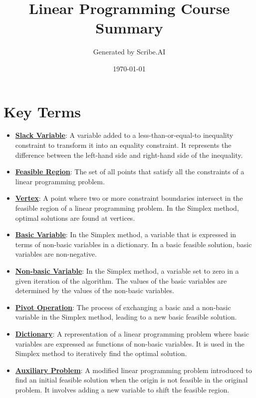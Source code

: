 \documentclass{article}%
\title{Linear Programming Course Summary}%
\author{Generated by Scribe.AI}%
\date{\today}%
\begin{document}
%
\normalsize%
\maketitle%
\section{Key Terms}%
\label{sec:KeyTerms}%
\begin{itemize}[leftmargin=*]%
\item \href{https://www.math.purdue.edu/~yipn/421/2024-08-27-ExSimplex.pdf#page=1}{\textbf{Slack Variable}}: A variable added to a less-than-or-equal-to inequality constraint to transform it into an equality constraint. It represents the difference between the left-hand side and right-hand side of the inequality.%
\item \href{https://www.math.purdue.edu/~yipn/421/2024-08-27-ExSimplex.pdf#page=4}{\textbf{Feasible Region}}: The set of all points that satisfy all the constraints of a linear programming problem.%
\item \href{https://www.math.purdue.edu/~yipn/421/2024-08-27-ExSimplex.pdf#page=5}{\textbf{Vertex}}: A point where two or more constraint boundaries intersect in the feasible region of a linear programming problem. In the Simplex method, optimal solutions are found at vertices.%
\item \href{https://www.math.purdue.edu/~yipn/421/2024-08-27-ExSimplex.pdf#page=6}{\textbf{Basic Variable}}: In the Simplex method, a variable that is expressed in terms of non-basic variables in a dictionary. In a basic feasible solution, basic variables are non-negative.%
\item \href{https://www.math.purdue.edu/~yipn/421/2024-08-27-ExSimplex.pdf#page=6}{\textbf{Non{-}basic Variable}}: In the Simplex method, a variable set to zero in a given iteration of the algorithm. The values of the basic variables are determined by the values of the non-basic variables.%
\item \href{https://www.math.purdue.edu/~yipn/421/2024-08-27-ExSimplex.pdf#page=9}{\textbf{Pivot Operation}}: The process of exchanging a basic and a non-basic variable in the Simplex method, leading to a new basic feasible solution.%
\item \href{https://www.math.purdue.edu/~yipn/421/2024-08-27-ExSimplex.pdf#page=26}{\textbf{Dictionary}}: A representation of a linear programming problem where basic variables are expressed as functions of non-basic variables. It is used in the Simplex method to iteratively find the optimal solution.%
\item \href{https://www.math.purdue.edu/~yipn/421/2024-08-27-ExSimplex.pdf#page=32}{\textbf{Auxiliary Problem}}: A modified linear programming problem introduced to find an initial feasible solution when the origin is not feasible in the original problem. It involves adding a new variable to shift the feasible region.%
\end{itemize}%
\end{document}
